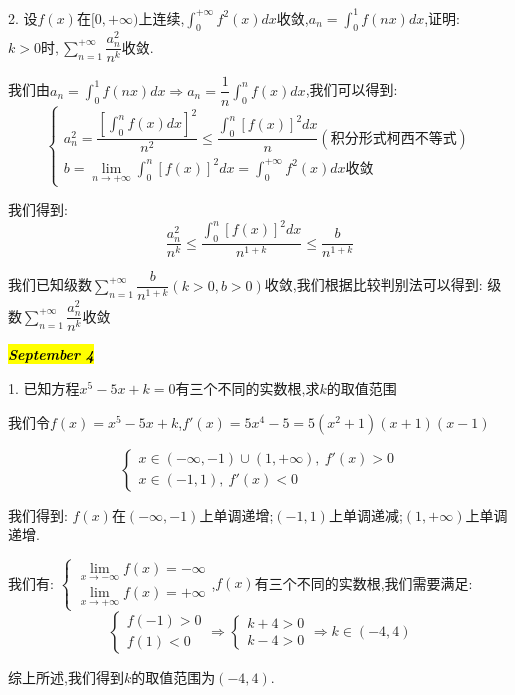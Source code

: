 2. 设$f(x)$在$[0,+\infty)$上连续,$\int_{0}^{+\infty}f^{2}(x)dx$收敛,$a_{n}=\int_{0}^{1}f(nx)dx$,证明:  $k>0\text{时},\sum\limits_{n=1}^{+\infty}\dfrac{a_{n}^2}{n^k}$收敛.
\begin{solution}

	我们由$a_{n}=\int_{0}^{1}f(nx)dx\Rightarrow a_{n}=\dfrac{1}{n}\int_{0}^{n}f(x)dx$,我们可以得到:  
	$$\left\lbrace
	\begin{array}{l}
		a_{n}^2=\dfrac{[\int_{0}^{n}f(x)dx]^2}{n^2}\leq \dfrac{\int_{0}^{n}[f(x)]^2dx}{n}(\text{积分形式柯西不等式})\\
		b=\lim\limits_{n\rightarrow+\infty}\int_{0}^{n}[f(x)]^2dx=\int_{0}^{+\infty}f^{2}(x)dx\text{收敛}
	\end{array}
	\right. $$
	
	我们得到:  $$\dfrac{a_{n}^2}{n^{k}}\leq \dfrac{\int_{0}^{n}[f(x)]^2dx}{n^{1+k}}\leq \dfrac{b}{n^{1+k}}$$
	
	我们已知级数$\sum\limits_{n=1}^{+\infty}\dfrac{b}{n^{1+k}}(k>0,b>0)$收敛,我们根据比较判别法可以得到:  级数$\sum\limits_{n=1}^{+\infty}\dfrac{a_{n}^2}{n^k}$收敛
\end{solution}

\hl{\textbf{\textit{September 4}}}

1. 已知方程$x^5-5x+k=0$有三个不同的实数根,求$k$的取值范围
\begin{solution}

	我们令$f(x)=x^5-5x+k$,$f'(x)=5x^4-5=5(x^2+1)(x+1)(x-1)$
	
	$$\left\lbrace
	\begin{array}{l}
		x\in(-\infty,-1)\cup(1,+\infty),\ f'(x)>0\\
		x\in(-1,1),\ f'(x)<0
	\end{array}
	\right. $$
	
	我们得到:  $f(x)$在$(-\infty,-1)$上单调递增;$(-1,1)$上单调递减;$(1,+\infty)$上单调递增.
	
	我们有:  $\left\lbrace
	\begin{array}{l}
		\lim\limits_{x\rightarrow -\infty}f(x)=-\infty\\
		\lim\limits_{x\rightarrow +\infty}f(x)=+\infty
	\end{array}
	\right. $,$f(x)$有三个不同的实数根,我们需要满足:  
	$$\left\lbrace
	\begin{array}{l}
		f(-1)>0\\
		f(1)<0
	\end{array}
	\right. \Rightarrow \left\lbrace
	\begin{array}{l}
		k+4>0\\
		k-4>0
	\end{array}
	\right. \Rightarrow k\in(-4,4)$$
	
	综上所述,我们得到$k$的取值范围为$(-4,4)$.
\end{solution}


